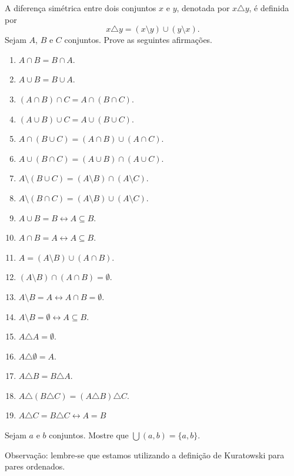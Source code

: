 \begin{exercise}
    A diferença simétrica entre dois conjuntos $x$ e $y$, denotada por $x \triangle y$, é definida por
    \[
    x \triangle y = (x \setminus y) \cup (y \setminus x).
    \]
    Sejam $A$, $B$ e $C$ conjuntos. Prove as seguintes afirmações.
    \begin{enumerate}[label=(\alph*)]
        \item $A\cap B=B\cap A$.
        \item $A\cup B=B\cup A$.
        \item $(A\cap B)\cap C = A\cap (B\cap C)$.
        \item $(A \cup B)\cup C = A\cup (B\cup C)$.
        \item $A\cap (B\cup C) = (A\cap B)\cup (A\cap C)$.
        \item $A\cup (B\cap C) = (A\cup B)\cap (A\cup C)$.
        \item $A\setminus(B\cup C) = (A\setminus B)\cap (A\setminus C)$.
        \item $A\setminus(B\cap C) = (A\setminus B)\cup (A\setminus C)$.
        \item $A\cup B=B \leftrightarrow A\subseteq B$.
        \item $A\cap B=A \leftrightarrow A\subseteq B$.
        \item $A = (A\setminus B)\cup (A\cap B)$.
        \item $(A\setminus B)\cap (A\cap B)=\emptyset$.
        \item $A\setminus B=A \leftrightarrow A\cap B=\emptyset$.
        \item $A\setminus B=\emptyset \leftrightarrow A\subseteq B$.
        \item $A\triangle A = \emptyset$.
        \item $A\triangle \emptyset = A$.
        \item $A\triangle B = B\triangle A$.
        \item $A\triangle (B\triangle C) = (A\triangle B)\triangle C$.
        \item $A\triangle C = B\triangle C \leftrightarrow A=B$

    \end{enumerate}
\end{exercise}

\begin{exercise}
    Sejam $a$ e $b$ conjuntos. Mostre que $\bigcup(a, b)=\{a, b\}$.
    
    Observação: lembre-se que estamos utilizando a definição de Kuratowski para pares ordenados.
\end{exercise}